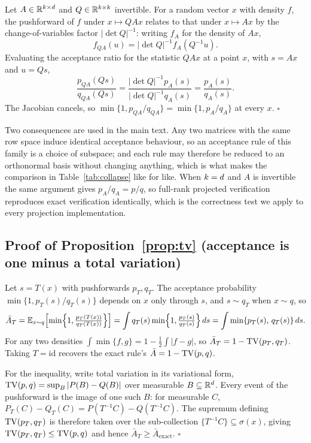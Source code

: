 Let $A \in \mathbb{R}^{k\times d}$ and $Q \in \mathbb{R}^{k\times k}$ invertible. For a random vector $x$ with
density $f$, the pushforward of $f$ under $x \mapsto QAx$ relates to that under $x \mapsto Ax$ by the
change-of-variables factor $|\det Q|^{-1}$: writing $f_A$ for the density of $Ax$,
\[
f_{QA}(u) = |\det Q|^{-1} f_A(Q^{-1}u).
\]
Evaluating the acceptance ratio for the statistic $QAx$ at a point $x$, with $s = Ax$ and $u = Qs$,
\[
\frac{p_{QA}(Qs)}{q_{QA}(Qs)}
= \frac{|\det Q|^{-1} p_A(s)}{|\det Q|^{-1} q_A(s)}
= \frac{p_A(s)}{q_A(s)} .
\]
The Jacobian cancels, so $\min\{1, p_{QA}/q_{QA}\} = \min\{1, p_A/q_A\}$ at every $x$. $\square$

Two consequences are used in the main text. Any two matrices with the same row space induce identical
acceptance behaviour, so an acceptance rule of this family is a choice of subspace; and each rule may
therefore be reduced to an orthonormal basis without changing anything, which is what makes the
comparison in Table~\ref{tab:collapse} like for like. When $k = d$ and $A$ is invertible the same
argument gives $p_A/q_A = p/q$, so full-rank projected verification reproduces exact verification
identically, which is the correctness test we apply to every projection implementation.

\subsection{Proof of Proposition~\ref{prop:tv} (acceptance is one minus a total variation)}

Let $s = T(x)$ with pushforwards $p_T, q_T$. The acceptance probability $\min\{1, p_T(s)/q_T(s)\}$
depends on $x$ only through $s$, and $s \sim q_T$ when $x \sim q$, so
\[
\bar{A}_T = \mathbb{E}_{x \sim q}\!\left[\min\!\left\{1, \tfrac{p_T(T(x))}{q_T(T(x))}\right\}\right]
= \int q_T(s) \min\!\left\{1, \tfrac{p_T(s)}{q_T(s)}\right\} ds
= \int \min\{p_T(s),\, q_T(s)\}\, ds .
\]
For any two densities $\int \min\{f, g\} = 1 - \tfrac{1}{2}\int |f - g|$, so
$\bar{A}_T = 1 - \operatorname{TV}(p_T, q_T)$. Taking $T = \mathrm{id}$ recovers the exact rule's
$\bar{A} = 1 - \operatorname{TV}(p,q)$.

For the inequality, write total variation in its variational form,
$\operatorname{TV}(p,q) = \sup_B |P(B) - Q(B)|$ over measurable $B \subseteq \mathbb{R}^d$. Every event of the
pushforward is the image of one such $B$: for measurable $C$, $P_T(C) - Q_T(C) = P(T^{-1}C) -
Q(T^{-1}C)$. The supremum defining $\operatorname{TV}(p_T, q_T)$ is therefore taken over the sub-collection
$\{T^{-1}C\} \subseteq \sigma(x)$, giving $\operatorname{TV}(p_T, q_T) \le \operatorname{TV}(p, q)$ and hence
$\bar{A}_T \ge \bar{A}_{\mathrm{exact}}$. $\square$

